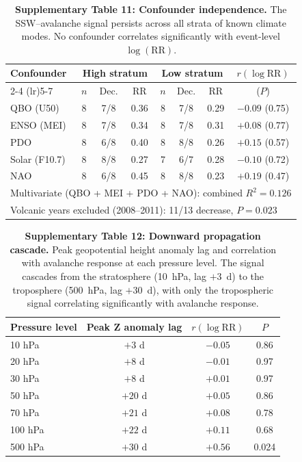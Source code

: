 \documentclass[11pt,letterpaper]{article}
\begin{document}
\begin{table}[!ht]
\centering
\caption{\textbf{Supplementary Table 11: Confounder independence.}
The SSW--avalanche signal persists across all strata of known climate modes. No confounder correlates significantly with event-level $\log(\mathrm{RR})$.}
\label{tab:confounders}
\small
\begin{tabular}{lccccccc}
\toprule
Confounder & \multicolumn{3}{c}{High stratum} & \multicolumn{3}{c}{Low stratum} & $r(\log\mathrm{RR})$ \\
\cmidrule(lr){2-4} \cmidrule(lr){5-7}
 & $n$ & Dec. & RR & $n$ & Dec. & RR & ($P$) \\
\midrule
QBO (U50) & 8 & 7/8 & 0.36 & 8 & 7/8 & 0.29 & $-0.09$ (0.75) \\
ENSO (MEI) & 8 & 7/8 & 0.34 & 8 & 7/8 & 0.31 & $+0.08$ (0.77) \\
PDO & 8 & 6/8 & 0.40 & 8 & 8/8 & 0.26 & $+0.15$ (0.57) \\
Solar (F10.7) & 8 & 8/8 & 0.27 & 7 & 6/7 & 0.28 & $-0.10$ (0.72) \\
NAO & 8 & 6/8 & 0.45 & 8 & 8/8 & 0.23 & $+0.19$ (0.47) \\
\midrule
\multicolumn{8}{l}{Multivariate (QBO + MEI + PDO + NAO): combined $R^2 = 0.126$} \\
\multicolumn{8}{l}{Volcanic years excluded (2008--2011): 11/13 decrease, $P = 0.023$} \\
\bottomrule
\end{tabular}
\end{table}

\begin{table}[!ht]
\centering
\caption{\textbf{Supplementary Table 12: Downward propagation cascade.}
Peak geopotential height anomaly lag and correlation with avalanche response at each pressure level. The signal cascades from the stratosphere (10~hPa, lag $+3$~d) to the troposphere (500~hPa, lag $+30$~d), with only the tropospheric signal correlating significantly with avalanche response.}
\label{tab:propagation}
\small
\begin{tabular}{lccc}
\toprule
Pressure level & Peak Z anomaly lag & $r(\log\mathrm{RR})$ & $P$ \\
\midrule
10 hPa & $+3$ d & $-0.05$ & 0.86 \\
20 hPa & $+8$ d & $-0.01$ & 0.97 \\
30 hPa & $+8$ d & $+0.01$ & 0.97 \\
50 hPa & $+20$ d & $+0.05$ & 0.86 \\
70 hPa & $+21$ d & $+0.08$ & 0.78 \\
100 hPa & $+22$ d & $+0.11$ & 0.68 \\
500 hPa & $+30$ d & $+0.56$ & 0.024 \\
\bottomrule
\end{tabular}
\end{table}
\end{document}
